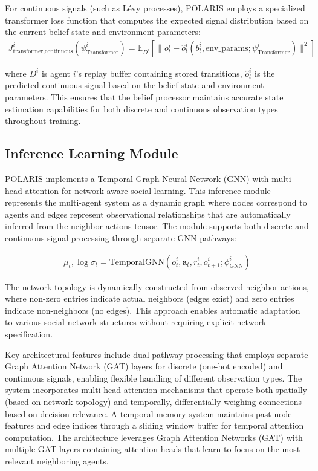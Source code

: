 For continuous signals (such as Lévy processes), POLARIS employs a specialized transformer loss function that computes the expected signal distribution based on the current belief state and environment parameters:
\begin{align}
    J^i_{\text{transformer,continuous}}(\psi^i_{\text{Transformer}}) = \mathbb{E}_{D^i}\left[\|o^i_t - \hat{o}^i_t(b^i_t, \text{env\_params}; \psi^i_{\text{Transformer}})\|^2\right]
\end{align}

where $D^i$ is agent $i$'s replay buffer containing stored transitions, $\hat{o}^i_t$ is the predicted continuous signal based on the belief state and environment parameters. This ensures that the belief processor maintains accurate state estimation capabilities for both discrete and continuous observation types throughout training.

\subsection{Inference Learning Module}

POLARIS implements a Temporal Graph Neural Network (GNN) with multi-head attention for network-aware social learning. This inference module represents the multi-agent system as a dynamic graph where nodes correspond to agents and edges represent observational relationships that are automatically inferred from the neighbor actions tensor. The module supports both discrete and continuous signal processing through separate GNN pathways:

\begin{align}
    \mu_t, \log\sigma_t = \text{TemporalGNN}(o^i_t, \boldsymbol{a}_t, r^i_t, o^i_{t+1}; \phi^i_{\text{GNN}})
\end{align}

The network topology is dynamically constructed from observed neighbor actions, where non-zero entries indicate actual neighbors (edges exist) and zero entries indicate non-neighbors (no edges). This approach enables automatic adaptation to various social network structures without requiring explicit network specification.

Key architectural features include dual-pathway processing that employs separate Graph Attention Network (GAT) layers for discrete (one-hot encoded) and continuous signals, enabling flexible handling of different observation types. The system incorporates multi-head attention mechanisms that operate both spatially (based on network topology) and temporally, differentially weighing connections based on decision relevance. A temporal memory system maintains past node features and edge indices through a sliding window buffer for temporal attention computation. The architecture leverages Graph Attention Networks (GAT) with multiple GAT layers containing attention heads that learn to focus on the most relevant neighboring agents.

